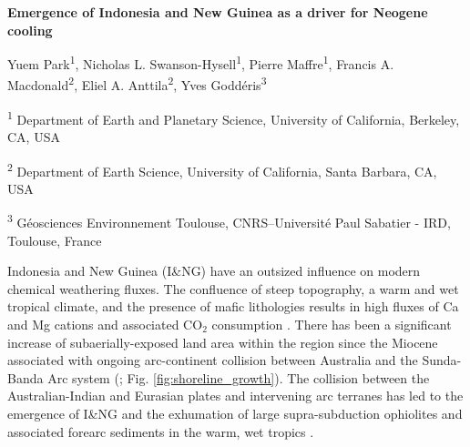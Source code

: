 \documentclass[11pt,letterpaper]{article}
\newcommand{\COtwo}{CO$_{2}$\xspace}
\begin{document}
\begin{flushleft}
{\Large \textbf{Emergence of Indonesia and New Guinea as a driver for Neogene cooling}}

Yuem Park\textsuperscript{1},
Nicholas L. Swanson-Hysell\textsuperscript{1},
Pierre Maffre\textsuperscript{1},
Francis A. Macdonald\textsuperscript{2},
Eliel A. Anttila\textsuperscript{2},
Yves Godd\'eris\textsuperscript{3}

\bigskip
\textsuperscript{1} Department of Earth and Planetary Science, University of California, Berkeley, CA, USA

\textsuperscript{2} Department of Earth Science, University of California, Santa Barbara, CA, USA

\textsuperscript{3} G\'eosciences Environnement Toulouse, CNRS--Universit\'e Paul Sabatier - IRD, Toulouse, France

\bigskip

\end{flushleft}

\linenumbers

Indonesia and New Guinea (I\&NG) have an outsized influence on modern chemical weathering fluxes. The confluence of steep topography, a warm and wet tropical climate, and the presence of mafic lithologies results in high fluxes of Ca and Mg cations and associated \COtwo consumption \citep{Gaillardet1999a, Hartmann2009a, Hartmann2014a}. There has been a significant increase of subaerially-exposed land area within the region since the Miocene associated with ongoing arc-continent collision between Australia and the Sunda-Banda Arc system (\citealp{Molnar2015a, Hall2017a}; Fig. \ref{fig:shoreline_growth}). The collision between the Australian-Indian and Eurasian plates and intervening arc terranes has led to the emergence of I\&NG and the exhumation of large supra-subduction ophiolites and associated forearc sediments in the warm, wet tropics \citep{Macdonald2019a}.
\end{document}
